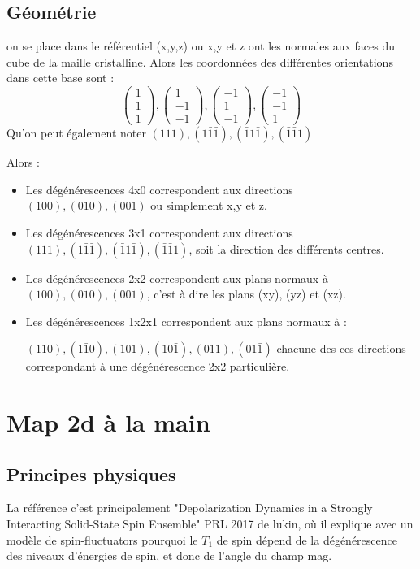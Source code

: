 \documentclass[a4paper]{report}
\begin{document}
\subsection{Géométrie}
on se place dans le référentiel (x,y,z) ou x,y et z ont les normales aux faces du cube de la maille cristalline. Alors les coordonnées des différentes orientations dans cette base sont :
\begin{equation}
\begin{pmatrix}
1 \\ 1 \\ 1
\end{pmatrix} ,
\begin{pmatrix}
1 \\ -1 \\ -1
\end{pmatrix} ,
\begin{pmatrix}
-1 \\ 1 \\ -1
\end{pmatrix} ,
\begin{pmatrix}
-1 \\ -1 \\ 1
\end{pmatrix} 
\end{equation}
Qu'on peut également noter $(111), (1\bar{1}\bar{1}),(\bar{1}1\bar{1}),(\bar{1}\bar{1}1)$

Alors :
\begin{itemize}
\item Les dégénérescences 4x0 correspondent aux directions $(100), (010), (001)$ ou simplement x,y et z.
\item Les dégénérescences 3x1 correspondent aux directions $(111), (1\bar{1}\bar{1}),(\bar{1}1\bar{1}),(\bar{1}\bar{1}1)$, soit la direction des différents centres.
\item Les dégénérescences 2x2 correspondent aux plans normaux à $(100), (010), (001)$, c'est à dire les plans (xy), (yz) et (xz).
\item Les dégénérescences 1x2x1 correspondent aux plans normaux à :

$(110), (1\bar{1}0),(101), (10\bar{1}),(011), (01\bar{1})$ chacune des ces directions correspondant à une dégénérescence 2x2 particulière. 
\end{itemize}
  \section{Map 2d à la main}
  \subsection{Principes physiques}
  La référence c'est principalement "Depolarization Dynamics in a Strongly Interacting Solid-State Spin Ensemble" PRL 2017 de lukin, où il explique avec un modèle de spin-fluctuators pourquoi le $T_1$ de spin dépend de la dégénérescence des niveaux d'énergies de spin, et donc de l'angle du champ mag.
  
\end{document}
